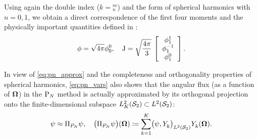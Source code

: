 Using again the double index
($k = {}_n^m$) and the form of spherical harmonics with $n = 0,1$, we obtain a direct correspondence of the first four moments and the physically important quantities defined in :
$$
	\phi = \sqrt{4\pi}\angmom{0}{0},\quad \bJ = \sqrt{\frac{4\pi }{3}}\, \left[\begin{array}{c}\angmom{1}{1}\\
	\angmom{1}{-1}\\ \angmom{1}{0}\end{array}\right].
$$


In view of \eqref{eq:pn_approx} and the completeness and orthogonality properties of spherical harmonics,
\eqref{eq:pn_vars} also shows that the angular flux (as a function of $\bomega$) in the $\PN$ method is actually
approximated by its orthogonal projection onto the finite-dimensional subspace $\Lp[2]_K(\Sphere)\subset\Lp[2](\Sphere)$:
\begin{equation}\label{eq:PN_proj}
	\psi \approx \Projop\psi, \quad \bigl(\Projop\psi\bigr)(\bomega) \coloneqq \sum_{k=1}^{ K}\ipsl{\psi}{\Y{k}{}}
	\Y{k}{}(\bomega).
\end{equation}

